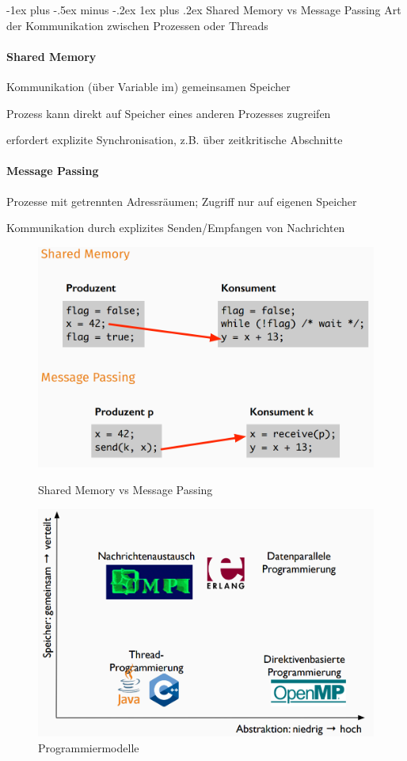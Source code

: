 \documentclass[10pt]{article}
\makeatletter
\renewcommand{\subsubsection}{\@startsection{subsubsection}{3}{0mm}%
                                {-1ex plus -.5ex minus -.2ex}%
                                {1ex plus .2ex}%
                                {\normalfont\small\bfseries}}
\makeatother
\begin{document}
  \subsubsection{Shared Memory vs Message Passing}
  Art der Kommunikation zwischen Prozessen oder Threads
  \paragraph{Shared Memory}
  \begin{itemize*}
    \item Kommunikation (über Variable im) gemeinsamen Speicher
    \item Prozess kann direkt auf Speicher eines anderen Prozesses zugreifen
    \item erfordert explizite Synchronisation, z.B. über zeitkritische Abschnitte
  \end{itemize*}
  \paragraph{Message Passing}
  \begin{itemize*}
    \item Prozesse mit getrennten Adressräumen; Zugriff nur auf eigenen Speicher
    \item Kommunikation durch explizites Senden/Empfangen von Nachrichten
  \end{itemize*}
  
  \begin{figure}[!tbp]
    \centering
    \begin{minipage}[b]{0.45\textwidth}
      \includegraphics[width=0.4\linewidth]{Assets/Programmierparadigmen-Shared-Memory-vs-Message-Passing}
      \caption{Shared Memory vs Message Passing}
    \end{minipage}
    \hfill
    \begin{minipage}[b]{0.45\textwidth}
      \includegraphics[width=0.9\linewidth]{Assets/Programmierparadigmen-Programmiermodelle}
      \caption{Programmiermodelle}
    \end{minipage}
  \end{figure}
  
\end{document}

